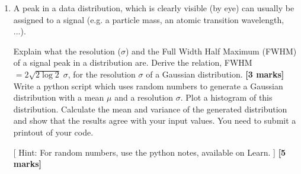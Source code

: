 \begin{enumerate}
\begin{itemize}
\item Delay generators can be used to delay the time at which one of the pulses reaches the coincidence counter.
Explain why it might be necessary to delay one of the pulses.
%
To determine whether two pulses are coincident, what logic operation is required?
\hfill {\bf [4 marks]}
%
\end{itemize}



\item A peak  in a data distribution, which is clearly visible (by eye) can usually be assigned to a signal (e.g. a particle mass, an atomic transition wavelength, ...). 

Explain what  the  resolution ($\sigma$) and the Full Width Half Maximum (FWHM)  of a signal peak in a distribution are. 
Derive the relation, FWHM$  = 2 \sqrt{2 \log 2}\; \sigma$, for the resolution $\sigma$ of a Gaussian distribution.  
\hfill {\bf [3 marks]}\\

Write a python script which uses random numbers to generate a Gaussian distribution with a mean $\mu$ and a resolution $\sigma$.
Plot a histogram of  this distribution.
Calculate the mean and variance  of the generated distribution and show 
that the results agree with your input values.
 You need to submit a printout of your code.

[ Hint: For random numbers, use the python notes, available on Learn. ]
\hfill {\bf [5 marks]}

\end{enumerate}